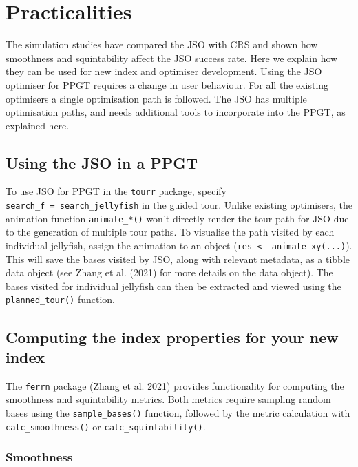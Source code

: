 \documentclass[
  12pt,
]{interact}
\theoremstyle{plain}
\begin{document}
\section{Practicalities}\label{sec-discussion}

The simulation studies have compared the JSO with CRS and shown how
smoothness and squintability affect the JSO success rate. Here we
explain how they can be used for new index and optimiser development.
Using the JSO optimiser for PPGT requires a change in user behaviour.
For all the existing optimisers a single optimisation path is followed.
The JSO has multiple optimisation paths, and needs additional tools to
incorporate into the PPGT, as explained here.

\subsection{Using the JSO in a PPGT}\label{using-the-jso-in-a-ppgt}

To use JSO for PPGT in the \texttt{tourr} package, specify
\texttt{search\_f\ =\ search\_jellyfish} in the guided tour. Unlike
existing optimisers, the animation function \texttt{animate\_*()} won't
directly render the tour path for JSO due to the generation of multiple
tour paths. To visualise the path visited by each individual jellyfish,
assign the animation to an object
(\texttt{res\ \textless{}-\ animate\_xy(...)}). This will save the bases
visited by JSO, along with relevant metadata, as a tibble data object
(see Zhang et al. (2021) for more details on the data object). The bases
visited for individual jellyfish can then be extracted and viewed using
the \texttt{planned\_tour()} function.

\subsection{Computing the index properties for your new
index}\label{computing-the-index-properties-for-your-new-index}

The \texttt{ferrn} package (Zhang et al. 2021) provides functionality
for computing the smoothness and squintability metrics. Both metrics
require sampling random bases using the \texttt{sample\_bases()}
function, followed by the metric calculation with
\texttt{calc\_smoothness()} or \texttt{calc\_squintability()}.

\subsubsection{Smoothness}\label{smoothness}
\end{document}
